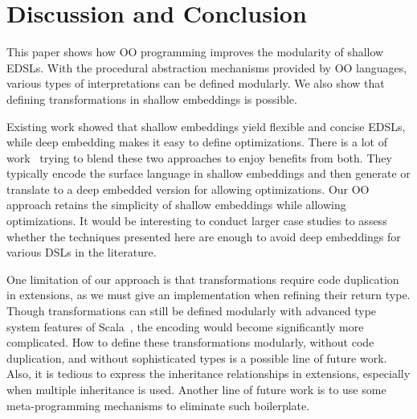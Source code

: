 \section{Discussion and Conclusion}
This paper shows how OO programming improves the modularity of shallow EDSLs.
With the procedural abstraction mechanisms provided by OO languages, various types of
interpretations can be defined modularly. We also show that defining
transformations in shallow embeddings is possible.

Existing work showed that shallow embeddings yield flexible and
concise EDSLs, while deep embedding makes it easy to define
optimizations. There is a lot of work~\cite{svenningsson2012combining,
  Jovanovic:2014:YCD:2658761.2658771, scherr2014implicit} trying to blend these two
approaches to enjoy benefits from both.
They typically encode the surface language in shallow embeddings and
then generate or translate to a deep embedded version for allowing optimizations.
Our OO approach retains the simplicity of shallow embeddings while
allowing optimizations. It would be interesting
to conduct larger case studies to assess whether the techniques
presented here are enough to avoid deep embeddings for various DSLs
in the literature.

One limitation of our approach is that
transformations require code duplication in extensions,
as we must give an implementation when refining their return type.
Though transformations can still be defined modularly with advanced type
system features of Scala~\cite{zenger05independentlyextensible},
the encoding would become significantly more complicated.
How to define these transformations modularly, without code
duplication, and without sophisticated types
is a possible line of future work.  Also, it is tedious to
express the inheritance relationships in extensions, especially when
multiple inheritance is used. Another line of future work is to use
some meta-programming mechanisms to eliminate such boilerplate.
